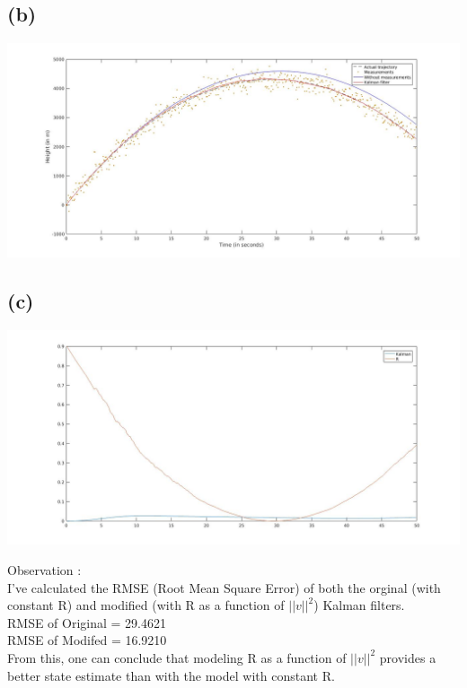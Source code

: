 \documentclass[a4paper,fleqn,11pt]{article}
\theoremstyle{mytheor}
\begin{document}
\subsection*{(b)}
\begin{center}
\includegraphics[scale = 0.37]{../images/q6_1.jpg} \\
\end{center}
\subsection*{(c)}
\begin{center}
\includegraphics[scale = 0.37]{../images/q6_2.jpg} \\
\end{center}

\pagebreak
Observation : \\
I've calculated the RMSE (Root Mean Square Error) of both the orginal (with constant R) and modified (with R as a function of $||v||^2$) Kalman filters. \\
RMSE of Original = 29.4621 \\
RMSE of Modifed = 16.9210 \\
From this, one can conclude that modeling R as a function of $||v||^2$ provides a better state estimate than with the model with constant R.
\end{document}
